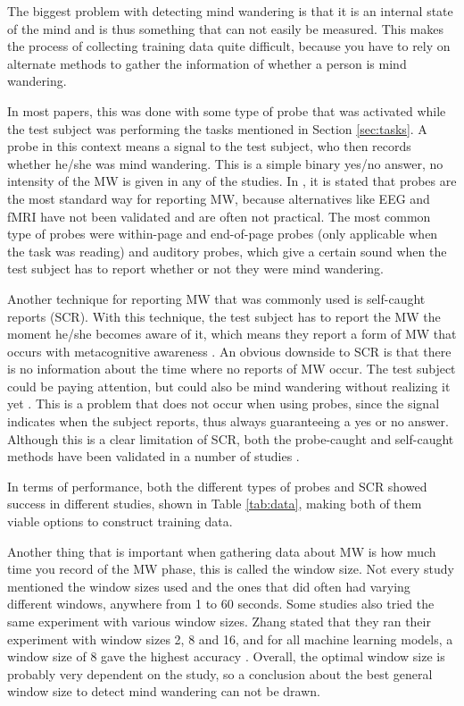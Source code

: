 The biggest problem with detecting mind wandering is that it is an internal state of the mind and is thus something that can not easily be measured. This makes the process of collecting training data quite difficult, because you have to rely on alternate methods to gather the information of whether a person is mind wandering.

In most papers, this was done with some type of probe that was activated while the test subject was performing the tasks mentioned in Section \ref{sec:tasks}. A probe in this context means a signal to the test subject, who then records whether he/she was mind wandering. This is a simple binary yes/no answer, no intensity of the MW is given in any of the studies. In \cite{Bixler2015AutomaticPhysiology}, it is stated that probes are the most standard way for reporting MW, because alternatives like EEG and fMRI have not been validated and are often not practical. The most common type of probes were within-page and end-of-page probes (only applicable when the task was reading) and auditory probes, which give a certain sound when the test subject has to report whether or not they were mind wandering.

Another technique for reporting MW that was commonly used is self-caught reports (SCR). With this technique, the test subject has to report the MW the moment he/she becomes aware of it, which means they report a form of MW that occurs with metacognitive awareness \cite{Bixler2015AutomaticAwareness}. An obvious downside to SCR is that there is no information about the time where no reports of MW occur. The test subject could be paying attention, but could also be mind wandering without realizing it yet \cite{Bixler2015AutomaticAwareness}. This is a problem that does not occur when using probes, since the signal indicates when the subject reports, thus always guaranteeing a yes or no answer. Although this is a clear limitation of SCR, both the probe-caught and self-caught methods have been validated in a number of studies \cite{Bixler2015AutomaticPhysiology}. 

In terms of performance, both the different types of probes and SCR showed success in different studies, shown in Table \ref{tab:data}, making both of them viable options to construct training data. 

Another thing that is important when gathering data about MW is how much time you record of the MW phase, this is called the window size. Not every study mentioned the window sizes used and the ones that did often had varying different windows, anywhere from 1 to 60 seconds. Some studies also tried the same experiment with various window sizes. Zhang stated that they ran their experiment with window sizes 2, 8 and 16, and for all machine learning models, a window size of 8 gave the highest accuracy \cite{ISI:000443429900018}. Overall, the optimal window size is probably very dependent on the study, so a conclusion about the best general window size to detect mind wandering can not be drawn.